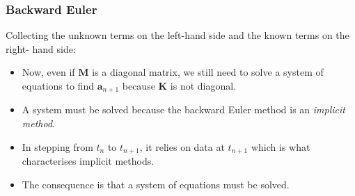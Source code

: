 \documentclass[notes]{beamer}
\begin{document}
\begin{frame}
\frametitle{Backward Euler}
Collecting the unknown terms on the left-hand side and the known terms on the right-
hand side:
\begin{itemize}
	\item Now, even if $\mathbf{M}$ is a diagonal matrix, we still need to solve a system of equations to find
	$\mathbf{a}_{n+1}$ because $\mathbf{K}$ is not diagonal. 
	
	\item A system must be solved because the backward Euler method is an \textit{implicit method}. 
	
	\item In stepping from $t_n$ to $t_{n+1}$, it relies on data at $t_{n+1}$ which is what characterises 
	implicit methods. 
	
	\item The consequence is that a system of equations must be solved.
\end{itemize}

\end{frame}

\end{document}
